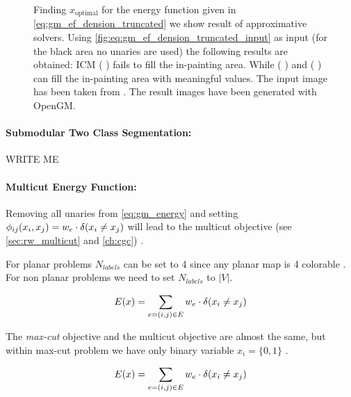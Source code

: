 \begin{figure}[H]
{    }
    \caption[Energy based truncated denoising]{
        Finding $x_{\text{optimal}} $ for the energy function given
        in \cref{eq:gm_ef_dension_truncated} we show result of approximative solvers.
        Using \cref{fig:eq:gm_ef_dension_truncated_input} as input (for the black area no unaries 
        are used)
        the following
        results are obtained: ICM \cite{TODO_ICM}  ( ) fails
        to fill the in-painting area. While \cite{TODO_TRWS}  ( ) 
        and \cite{TODO_ALPHA_E}  ( ) can fill the in-painting area
        with meaningful values.
        The input image has been taken from \citep{szeliski_2008_pami}.
        The result images have been generated with OpenGM.
    }\label{fig:gm_ef_dension_truncated}
\end{figure}


\paragraph{Submodular Two Class Segmentation:}
    WRITE ME



\paragraph{Multicut Energy Function:}
Removing all unaries from \cref{eq:gm_energy} and 
setting $\phi_{ij}(x_i,x_j) =   w_e \cdot \delta( x_i \neq x_j )$ 
will lead to the multicut objective (see \cref{sec:rw_multicut} and \cref{ch:cgc}) .

For planar problems  $N_{labels}$ can be set to 4 since any planar map is 4 colorable \citep{appel_1977_4color}.
For non planar problems we need to set $N_{labels}$ to $|V|$.



\begin{align}
E(x)=
    \sum_{ e=(i,j) \in E}
        w_e \cdot \delta( x_i \neq x_j )
    \label{eq:gm_ef_multicut}
\end{align}


The \emph{max-cut} objective and  the multicut objective
are almost the same, 
but within max-cut problem we have only binary variable $x_i=\{0,1\}$ .

\begin{align}
E(x)=
    \sum_{ e=(i,j) \in E}
        w_e \cdot \delta( x_i \neq x_j )
    \label{eq:gm_ef_max_cut}
\end{align}




